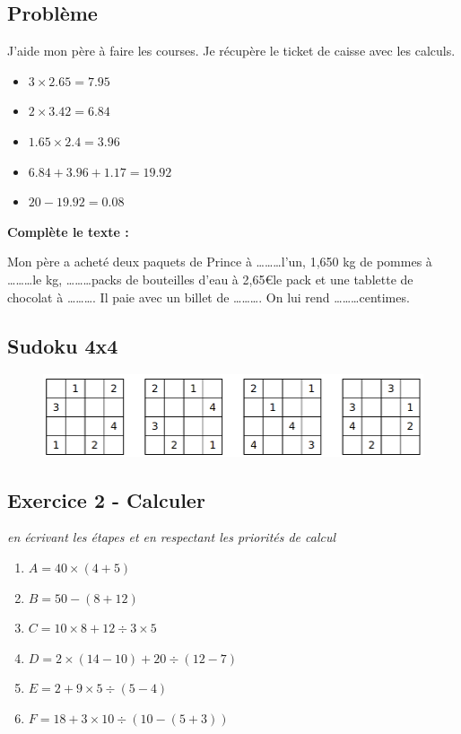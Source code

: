 \subsection*{Problème}

J'aide mon père à faire les courses. Je récupère le ticket de caisse avec les calculs.
\begin{itemize}
  \item $3 \times 2.65 = 7.95$
  \item $2 \times 3.42 = 6.84$
  \item $1.65 \times 2.4 = 3.96$
  \item $6.84 + 3.96 + 1.17 = 19.92$
  \item $20 - 19.92 = 0.08$
\end{itemize}

\textbf{Complète le texte : }

Mon père a acheté deux paquets de Prince à \ldots\ldots\ldots l'un, 1,650 kg de pommes à \ldots\ldots\ldots le kg, \ldots\ldots\ldots packs de bouteilles d'eau à 2,65\euro le pack et une tablette de chocolat à \ldots\ldots\ldots . Il paie avec un billet de \ldots\ldots\ldots . On lui rend \ldots\ldots\ldots centimes.

\subsection*{Sudoku 4x4}

\begin{figure}[H]
  \centering
  \includegraphics[width=0.8\linewidth]{5x1-calculs/sudoku-4b.png}
\end{figure}

\newpage

\subsection*{Exercice 2 - Calculer}
\textit{en écrivant les étapes et en respectant les priorités de calcul}

\begin{multicols}{3}\noindent

  \begin{enumerate}
    \item $A = 40 \times (4 + 5)$ 
    \item $B = 50 - (8 + 12)$ 
    \item $C = 10 \times 8 + 12 \div 3 \times 5$ 
    \item $D = 2 \times (14 - 10) + 20 \div (12-7)$ 
    \item $E = 2 + 9 \times 5 \div (5-4)$ 
    \item $F = 18 + 3 \times 10 \div (10-(5+3))$ 
  \end{enumerate}

\end{multicols}

\Pointilles[47]

